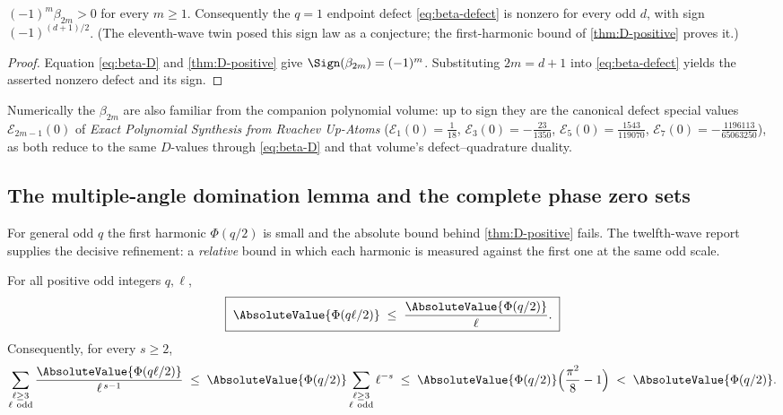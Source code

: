 \begin{corollary}
\label{cor:beta-sign}
$(-1)^{m}\beta_{2m}>0$ for every $m\ge1$.  Consequently the
$q=1$ endpoint defect \eqref{eq:beta-defect} is nonzero for every odd
$d$, with sign $(-1)^{(d+1)/2}$.  (The eleventh-wave twin posed this
sign law as a conjecture; the first-harmonic bound of
\cref{thm:D-positive} proves it.)
\end{corollary}

\begin{proof}
Equation \eqref{eq:beta-D} and \cref{thm:D-positive} give
$\Sign(\beta_{2m})=(-1)^m$.  Substituting $2m=d+1$ into
\eqref{eq:beta-defect} yields the asserted nonzero defect and its sign.
\end{proof}

Numerically the $\beta_{2m}$ are also familiar from the companion
polynomial volume: up to sign they are the canonical defect special
values $\mathcal E_{2m-1}(0)$ of \emph{Exact Polynomial Synthesis
from Rvachev Up-Atoms}
($\mathcal E_1(0)=\tfrac1{18}$, $\mathcal E_3(0)=-\tfrac{23}{1350}$,
$\mathcal E_5(0)=\tfrac{1543}{119070}$,
$\mathcal E_7(0)=-\tfrac{1196113}{65063250}$), as both reduce to the
same $D$-values through \eqref{eq:beta-D} and that volume's
defect--quadrature duality.

\subsection{The multiple-angle domination lemma and the complete
phase zero sets}

For general odd $q$ the first harmonic $\Phi(q/2)$ is small and the
absolute bound behind \cref{thm:D-positive} fails.  The twelfth-wave
report supplies the decisive refinement: a \emph{relative} bound in
which each harmonic is measured against the first one at the same odd
scale.

\begin{lemma}
\label{lem:multiple-angle}
For all positive odd integers $q,\ell$,
\begin{equation}
 \boxed{\;
 \AbsoluteValue{\Phi(q\ell/2)}\;\le\;\frac{\AbsoluteValue{\Phi(q/2)}}{\ell}.\;}
 \label{eq:multiple-angle}
\end{equation}
Consequently, for every $s\ge2$,
\begin{equation}
 \sum_{\substack{\ell\ge3\\ \ell\ \mathrm{odd}}}
 \frac{\AbsoluteValue{\Phi(q\ell/2)}}{\ell^{\,s-1}}
 \;\le\;\AbsoluteValue{\Phi(q/2)}
 \sum_{\substack{\ell\ge3\\ \ell\ \mathrm{odd}}}\ell^{-s}
 \;\le\;\AbsoluteValue{\Phi(q/2)}\Bigl(\frac{\pi^{2}}8-1\Bigr)
 \;<\;\AbsoluteValue{\Phi(q/2)}.
 \label{eq:relative-dominance}
\end{equation}
\end{lemma}

